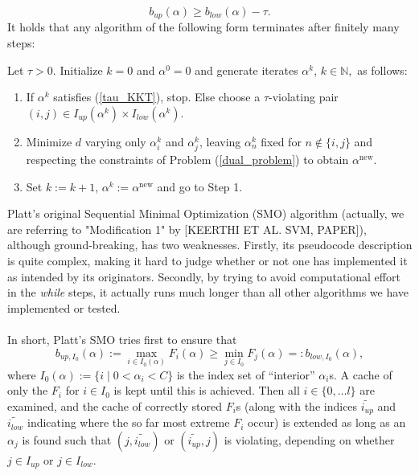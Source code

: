 \begin{equation}\label{tau_KKT}
b_{up}(\alpha) \geq b_{low}(\alpha) - \tau.
\end{equation}
It holds that any algorithm of the following form terminates after finitely many steps:
\begin{algorithm}\label{GSMO} Let $\tau > 0$. Initialize $k = 0 $ and $\alpha^0 = 0$ and generate iterates $\alpha^k$, $k \in \mathbb{N},$ as follows: 
\begin{enumerate}
\item If $\alpha^k$ satisfies (\ref{tau_KKT}), stop. Else choose a $\tau$-violating pair $(i,j) \in I_{up}(\alpha^k) \times I_{low}(\alpha^k)$.
\item Minimize $d$ varying only $\alpha^k_i$ and $\alpha^k_j$, leaving $\alpha^k_n$ fixed for $n \notin \{i,j\}$ and respecting the constraints of Problem (\ref{dual_problem}) to obtain $\alpha^{\text{new}}$.
\item Set $k := k+1$, $\alpha^k := \alpha^{\text{new}}$ and go to Step 1.
\end{enumerate}
\end{algorithm} 
Platt's original Sequential Minimal Optimization (SMO) algorithm (actually, we are referring to "Modification 1" by \cite{keerthisvm}[KEERTHI ET AL. SVM, PAPER]), although ground-breaking, has two weaknesses. Firstly, its pseudocode description is quite complex, making it hard to judge whether or not one has implemented it as intended by its originators. Secondly, by trying to avoid computational effort in the \textit{while} steps, it actually runs much longer than all other algorithms we have implemented or tested.\\\\
In short, Platt's SMO tries first to ensure that
\[
b_{up,I_0}(\alpha) := \max_{i \in I_0(\alpha)} F_i(\alpha) \geq \min_{j \in I_0} F_j(\alpha) =: b_{low,I_0}(\alpha),
\]
where $I_0(\alpha) := \{ i  \mid  0 < \alpha_i < C \}$ is the index set of ``interior'' $\alpha_i$s. A cache of only the $F_i$ for $i \in I_0$ is kept until this is achieved. Then all $i \in \{0,\ldots l\}$ are examined, and the cache of correctly stored $F_i$s (along with the indices $\widetilde{i_{up}}$ and $\widetilde{i_{low}}$ indicating where the so far most extreme $F_i$ occur) is extended as long as an $\alpha_j$ is found such that $(j,\widetilde{i_{low}})$ or $(\widetilde{i_{up}},j)$ is violating, depending on whether $j \in I_{up}$ or $j \in I_{low}$.\\\\

